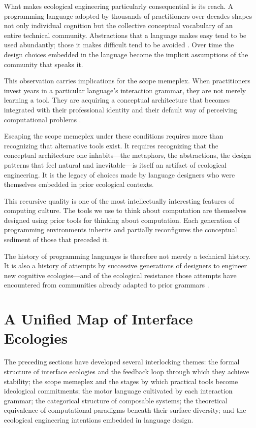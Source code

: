 \documentclass[11pt]{article}
\theoremstyle{definition}
\begin{document}
What makes ecological engineering particularly consequential is its
reach. A programming language adopted by thousands of practitioners
over decades shapes not only individual cognition but the collective
conceptual vocabulary of an entire technical community. Abstractions
that a language makes easy tend to be used abundantly; those it makes
difficult tend to be avoided \cite{brooks1975}. Over time the design
choices embedded in the language become the implicit assumptions of the
community that speaks it.

This observation carries implications for the scope memeplex. When
practitioners invest years in a particular language's interaction
grammar, they are not merely learning a tool. They are acquiring a
conceptual architecture that becomes integrated with their professional
identity and their default way of perceiving computational problems
\cite{norman1988}.

Escaping the scope memeplex under these conditions requires more than
recognizing that alternative tools exist. It requires recognizing that
the conceptual architecture one inhabits---the metaphors, the
abstractions, the design patterns that feel natural and inevitable---is
itself an artifact of ecological engineering. It is the legacy of
choices made by language designers who were themselves embedded in prior
ecological contexts.

This recursive quality is one of the most intellectually interesting
features of computing culture. The tools we use to think about
computation are themselves designed using prior tools for thinking
about computation. Each generation of programming environments inherits
and partially reconfigures the conceptual sediment of those that
preceded it.

The history of programming languages is therefore not merely a
technical history. It is also a history of attempts by successive
generations of designers to engineer new cognitive ecologies---and of
the ecological resistance those attempts have encountered from
communities already adapted to prior grammars \cite{floyd1979}.

\section{A Unified Map of Interface Ecologies}

The preceding sections have developed several interlocking themes:
the formal structure of interface ecologies and the feedback loop
through which they achieve stability; the scope memeplex and the stages
by which practical tools become ideological commitments; the motor
language cultivated by each interaction grammar; the categorical
structure of composable systems; the theoretical equivalence of
computational paradigms beneath their surface diversity; and the
ecological engineering intentions embedded in language design.
\end{document}
